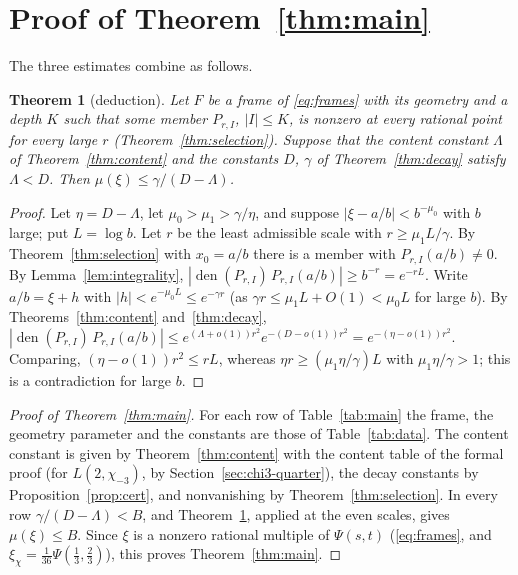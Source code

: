 \documentclass[11pt]{amsart}
\newtheorem{theorem}{Theorem}[section]
\theoremstyle{definition}
\theoremstyle{remark}
\numberwithin{equation}{section}
\newcommand{\den}{\operatorname{den}}
\begin{document}


\section{Proof of Theorem~\ref{thm:main}}\label{sec:proof}

The three estimates combine as follows.

\begin{theorem}[deduction]\label{thm:deduction}
Let $F$ be a frame of \eqref{eq:frames} with its geometry and a depth $K$ such that some member $P_{r,I}$, $|I|\le K$, is
nonzero at every rational point for every large $r$ (Theorem~\ref{thm:selection}). Suppose that the content constant
$\Lambda$ of Theorem~\ref{thm:content} and the constants $D$, $\gamma$ of Theorem~\ref{thm:decay} satisfy $\Lambda<D$. Then
$\mu(\xi)\le\gamma/(D-\Lambda)$.
\end{theorem}

\begin{proof}
Let $\eta=D-\Lambda$, let $\mu_0>\mu_1>\gamma/\eta$, and suppose $|\xi-a/b|<b^{-\mu_0}$ with $b$ large; put $L=\log b$. Let
$r$ be the least admissible scale with $r\ge\mu_1L/\gamma$. By Theorem~\ref{thm:selection} with $x_0=a/b$ there is a member
with $P_{r,I}(a/b)\ne0$. By Lemma~\ref{lem:integrality}, $|\den(P_{r,I})\,P_{r,I}(a/b)|\ge b^{-r}=e^{-rL}$.
Write $a/b=\xi+h$ with $|h|<e^{-\mu_0L}\le e^{-\gamma r}$ (as $\gamma r\le\mu_1L+O(1)<\mu_0L$ for large $b$). By
Theorems~\ref{thm:content} and~\ref{thm:decay},
$|\den(P_{r,I})\,P_{r,I}(a/b)|\le e^{(\Lambda+o(1))r^2}e^{-(D-o(1))r^2}=e^{-(\eta-o(1))r^2}$. Comparing,
$(\eta-o(1))r^2\le rL$, whereas $\eta r\ge(\mu_1\eta/\gamma)L$ with $\mu_1\eta/\gamma>1$; this is a contradiction for large
$b$.
\end{proof}

\begin{proof}[Proof of Theorem~\ref{thm:main}]
For each row of Table~\ref{tab:main} the frame, the geometry parameter and the constants are those of
Table~\ref{tab:data}. The content constant is given by Theorem~\ref{thm:content} with the content table of the formal proof
(for $L(2,\chi_{-3})$, by Section~\ref{sec:chi3-quarter}), the decay constants by Proposition~\ref{prop:cert}, and
nonvanishing by Theorem~\ref{thm:selection}. In every row $\gamma/(D-\Lambda)<B$, and Theorem~\ref{thm:deduction}, applied at
the even scales, gives $\mu(\xi)\le B$. Since $\xi$ is a nonzero rational multiple of
$\Psi(s,t)$ (\eqref{eq:frames}, and $\xi_\chi=\frac1{36}\Psi(\frac13,\frac23)$), this proves Theorem~\ref{thm:main}.
\end{proof}
\end{document}
